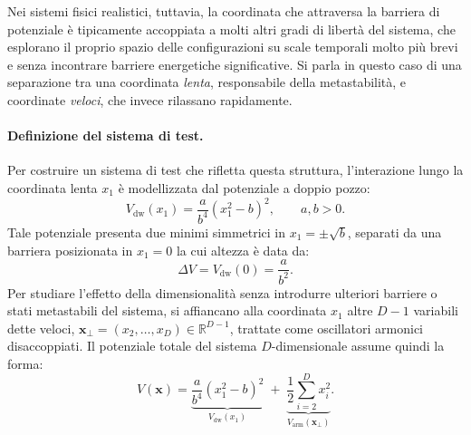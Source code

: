 Nei sistemi fisici realistici, tuttavia, la coordinata che attraversa la barriera di potenziale è tipicamente accoppiata a molti altri gradi di libertà del sistema, che esplorano il proprio spazio delle configurazioni su scale temporali molto più brevi e senza incontrare barriere energetiche significative. Si parla in questo caso di una separazione tra una coordinata \emph{lenta}, responsabile della metastabilità, e coordinate \emph{veloci}, che invece rilassano rapidamente.

\paragraph*{Definizione del sistema di test.} 
Per costruire un sistema di test che rifletta questa struttura, l'interazione lungo la coordinata lenta $x_1$ è modellizzata dal potenziale a doppio pozzo:
\begin{equation}
    V_{\text{dw}}(x_1) = \frac{a}{b^4}\left(x_1^2 - b\right)^2, \qquad a, b > 0.
\end{equation}
Tale potenziale presenta due minimi simmetrici in $x_1 = \pm\sqrt{b}$, separati da una barriera posizionata in $x_1 = 0$ la cui altezza è data da:
\begin{equation}
    \Delta V = V_{\text{dw}}(0) = \frac{a}{b^2}.
    \label{eq:barrier_height}
\end{equation}
Per studiare l'effetto della dimensionalità senza introdurre ulteriori barriere o stati metastabili del sistema, si affiancano alla coordinata $x_1$ altre $D-1$ variabili dette veloci, $\mathbf{x}_\perp = (x_2, \dots, x_D) \in \mathbb{R}^{D-1}$, trattate come oscillatori armonici disaccoppiati. Il potenziale totale del sistema $D$-dimensionale assume quindi la forma:
\begin{equation}
    V(\mathbf{x}) = \underbrace{\frac{a}{b^4}\left(x_1^2 - b\right)^2}_{V_{\text{dw}}(x_1)}
    \;+\; \underbrace{\frac{1}{2}\sum_{i=2}^{D} x_i^2}_{V_{\text{arm}}(\mathbf{x}_\perp)}.
    \label{eq:double_well_potential}
\end{equation}

